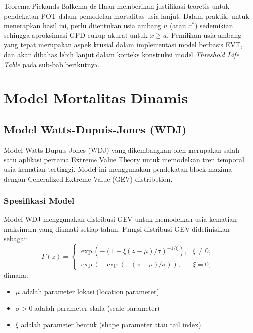 Teorema Pickands-Balkema-de Haan memberikan justifikasi teoretis untuk pendekatan POT dalam pemodelan mortalitas usia lanjut. Dalam praktik, untuk menerapkan hasil ini, perlu ditentukan usia ambang $u$ (atau $x^*$) sedemikian sehingga aproksimasi GPD cukup akurat untuk $x \geq u$. Pemilihan usia ambang yang tepat merupakan aspek krusial dalam implementasi model berbasis EVT, dan akan dibahas lebih lanjut dalam konteks konstruksi model \textit{Threshold Life Table} pada sub-bab berikutnya.

\section{Model Mortalitas Dinamis}

\subsection{Model Watts-Dupuis-Jones (WDJ)}

Model Watts-Dupuis-Jones (WDJ) yang dikembangkan oleh \citet{watts2006extreme} merupakan salah satu aplikasi pertama Extreme Value Theory untuk memodelkan tren temporal usia kematian tertinggi. Model ini menggunakan pendekatan block maxima dengan Generalized Extreme Value (GEV) distribution.

\subsubsection{Spesifikasi Model}

Model WDJ menggunakan distribusi GEV untuk memodelkan usia kematian maksimum yang diamati setiap tahun. Fungsi distribusi GEV didefinisikan sebagai:
\begin{equation}
F(z) = \begin{cases}
\exp\left(-(1 + \xi(z - \mu)/\sigma)^{-1/\xi}\right), & \xi \neq 0, \\
\exp(-\exp(-(z - \mu)/\sigma)), & \xi = 0,
\end{cases}
\label{eq:gev_distribution}
\end{equation}
dimana:
\begin{itemize}
    \item $\mu$ adalah parameter lokasi (location parameter)
    \item $\sigma > 0$ adalah parameter skala (scale parameter)
    \item $\xi$ adalah parameter bentuk (shape parameter atau tail index)
\end{itemize}

